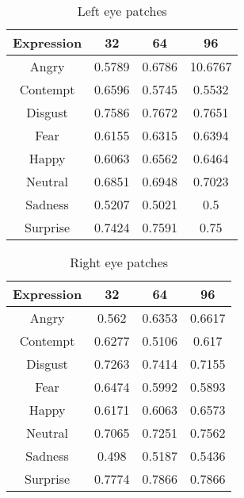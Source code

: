 \begin{table}
\caption{Left eye patches}
\label{table:left_eye}

\begin{tabular}{| c | c | c | c |}
\hline
Expression & 32 &  64  & 96  \\

\hline
Angry & 0.5789 & 0.6786 & 10.6767 \\
Contempt & 0.6596 &	0.5745 & 0.5532 \\
Disgust	& 0.7586 &	0.7672 &	0.7651 \\
Fear &	0.6155 & 0.6315 & 0.6394 \\ 
Happy &	0.6063 & 0.6562 & 0.6464 \\ 
Neutral & 0.6851 &	0.6948 & 0.7023 \\
Sadness &	0.5207 & 0.5021 &	0.5 \\
Surprise & 0.7424 &	0.7591 & 0.75 \\

\hline
\end{tabular}
\end{table}

\begin{table}
\caption{Right eye patches}
\label{table:right_eye}

\begin{tabular}{| c | c | c | c |}
\hline
Expression & 32 &  64  & 96  \\

\hline
Angry    & 0.562 & 0.6353 & 0.6617 \\
Contempt & 0.6277 & 0.5106 & 0.617 \\ 
Disgust	 & 0.7263 & 0.7414 & 0.7155 \\
Fear	 & 0.6474 & 0.5992 & 0.5893 \\
Happy	 & 0.6171 & 0.6063 & 0.6573 \\
Neutral  & 0.7065 & 0.7251 & 0.7562 \\
Sadness  & 0.498 & 0.5187 & 0.5436 \\
Surprise & 0.7774 & 0.7866 & 0.7866 \\

\hline
\end{tabular}
\end{table}

